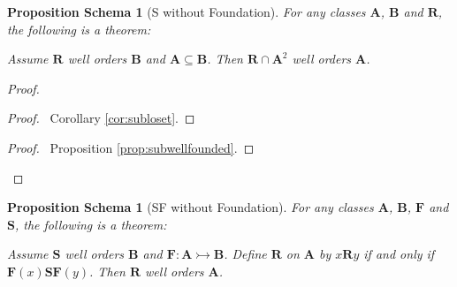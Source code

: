 \documentclass{book}
\let\qed\relax
\newtheorem{props}[ax]{Proposition Schema}
\theoremstyle{definition}
\begin{document}
\begin{props}[S without Foundation]
\label{prop:subwoset}
For any classes $\mathbf{A}$, $\mathbf{B}$ and $\mathbf{R}$, the following is a theorem:

Assume $\mathbf{R}$ well orders $\mathbf{B}$ and $\mathbf{A} \subseteq \mathbf{B}$. Then $\mathbf{R} \cap \mathbf{A}^2$ well orders $\mathbf{A}$.
\end{props}

\begin{proof}
\pf
{}
\begin{proof}
	\pf\ Corollary \ref{cor:subloset}.
\end{proof}
\begin{proof}
	\pf\ Proposition \ref{prop:subwellfounded}.
\end{proof}
\qed
\end{proof}

\begin{props}[SF without Foundation]
For any classes $\mathbf{A}$, $\mathbf{B}$, $\mathbf{F}$ and $\mathbf{S}$, the following is a theorem:

Assume $\mathbf{S}$ well orders $\mathbf{B}$ and $\mathbf{F} : \mathbf{A} \rightarrowtail \mathbf{B}$. Define $\mathbf{R}$ on $\mathbf{A}$ by $x \mathbf{R} y$ if and only if $\mathbf{F}(x) \mathbf{S} \mathbf{F}(y)$. Then $\mathbf{R}$ well orders $\mathbf{A}$.
\end{props}
\end{document}
